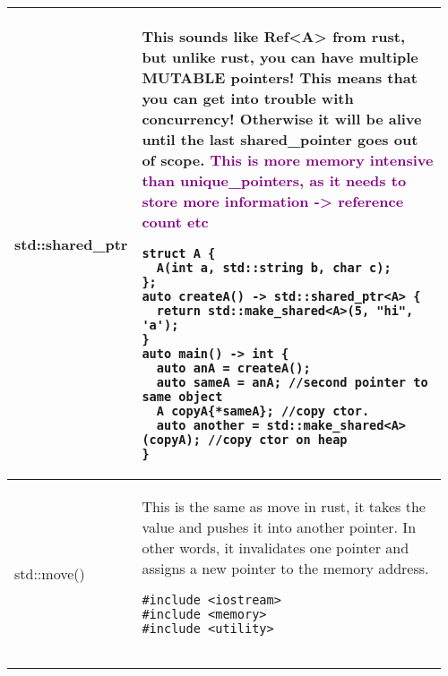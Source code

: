 \documentclass[main.tex,fontsize=8pt,paper=a4,paper=portrait,DIV=calc,]{scrartcl}
\begin{document}
\begin{table}[ht!]
\begin{tabular}{|m{0.2\linewidth}|m{0.755\linewidth}|}
\\
\hline
std::shared\_ptr & 
This sounds like Ref<A> from rust, but unlike rust, you can have \textbf{multiple MUTABLE pointers!}\newline
This means that you can get into trouble with concurrency!\newline
Otherwise it will be alive until the last shared\_pointer goes out of scope.\newline
\textcolor{purple}{This is more memory intensive than unique\_pointers, as it needs to store more information -> reference count etc}\newline
\begin{lstlisting}
struct A {
  A(int a, std::string b, char c);
};
auto createA() -> std::shared_ptr<A> {
  return std::make_shared<A>(5, "hi", 'a');
}
auto main() -> int {
  auto anA = createA();
  auto sameA = anA; //second pointer to same object
  A copyA{*sameA}; //copy ctor.
  auto another = std::make_shared<A>(copyA); //copy ctor on heap
}
\end{lstlisting}
\\
\hline
std::move() & 
This is the same as move in rust, it takes the value and pushes it into another pointer.\newline
In other words, it invalidates one pointer and assigns a new pointer to the memory address.\newline
\begin{lstlisting}
#include <iostream>
#include <memory>
#include <utility>


\end{lstlisting}
\end{tabular}
\end{table}
\end{document}
